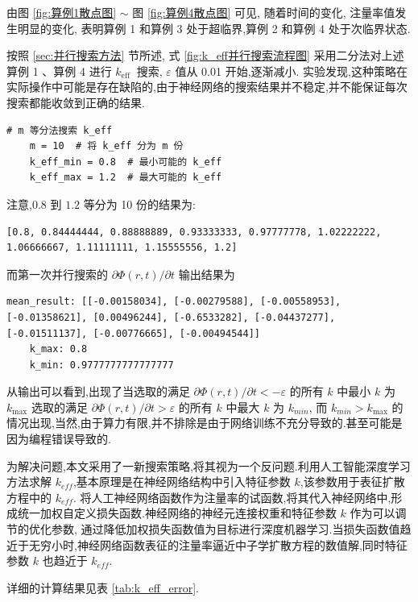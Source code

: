\documentclass{Sichuan Normal University}
\begin{document}
由图 \ref{fig:算例1散点图} $\sim$ 图 \ref{fig:算例4散点图} 可见, 随着时间的变化, 注量率值发生明显的变化, 表明算例 1 和算例 3 处于超临界,算例 2 和算例 4 处于次临界状态.

按照 \ref{sec:并行搜索方法} 节所述, 式 \eqref{fig:k_eff并行搜索流程图} 采用二分法对上述算例 1 、算例 4 进行 $k_{\text {eff }}$ 搜索, $\varepsilon$ 值从 0.01 开始,逐渐减小.
实验发现,这种策略在实际操作中可能是存在缺陷的,由于神经网络的搜索结果并不稳定,并不能保证每次搜索都能收敛到正确的结果.
\begin{lstlisting}[style=python,basicstyle=\footnotesize\fontspec{Courier New},]  
    # m 等分法搜索 k_eff
    m = 10  # 将 k_eff 分为 m 份
    k_eff_min = 0.8  # 最小可能的 k_eff
    k_eff_max = 1.2  # 最大可能的 k_eff
\end{lstlisting}
注意,$0.8$ 到 $1.2$ 等分为 10 份的结果为:
\begin{lstlisting}[style=python,basicstyle=\footnotesize\fontspec{Courier New},]  
    [0.8, 0.84444444, 0.88888889, 0.93333333, 0.97777778, 1.02222222, 1.06666667, 1.11111111, 1.15555556, 1.2]
\end{lstlisting}
而第一次并行搜索的 $\partial \Phi(r, t) / \partial t$ 输出结果为
\begin{lstlisting}[style=python,basicstyle=\footnotesize\fontspec{Courier New},]  
    mean_result: [[-0.00158034], [-0.00279588], [-0.00558953], [-0.01358621], [0.00496244], [-0.6533282], [-0.04437277], [-0.01511137], [-0.00776665], [-0.00494544]]  
    k_max: 0.8
    k_min: 0.9777777777777777
\end{lstlisting}
从输出可以看到,出现了当选取的满足 $\partial \Phi(r, t) / \partial t<-\varepsilon$ 的所有 $k$ 中最小 $k$ 为 $k_{\max }$
选取的满足 $\partial \Phi(r, t) / \partial t>\varepsilon$ 的所有 $k$ 中最大 $k$ 为 $k_{min}$,
而 $k_{min} > k_{\max }$ 的情况出现,当然,由于算力有限,并不排除是由于网络训练不充分导致的.甚至可能是因为编程错误导致的.

为解决问题,本文采用了一新搜索策略,将其视为一个反问题.利用人工智能深度学习方法求解 $k_{eff}$,基本原理是在神经网络结构中引入特征参数 $k$,该参数用于表征扩散方程中的 $k_{eff}$.
将人工神经网络函数作为注量率的试函数,将其代入神经网络中,形成统一加权自定义损失函数.神经网络的神经元连接权重和特征参数 $k$ 作为可以调节的优化参数,
通过降低加权损失函数值为目标进行深度机器学习\cite{LiuDongHeFanYingDuiYouXiaoZengZhiXiShuShenDuXueXiZhiJieSouSuoQiuJieFangFa}.当损失函数值趋近于无穷小时,神经网络函数表征的注量率逼近中子学扩散方程的数值解,同时特征参数 $k$ 也趋近于 $k_{eff}$.

详细的计算结果见表 \ref{tab:k_eff_error}.
\end{document}
